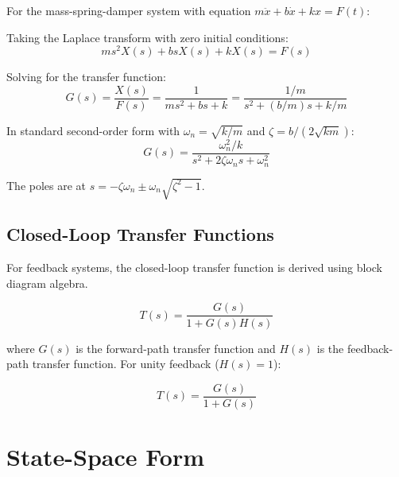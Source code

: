 \begin{examplebox}[title=Example 4.2: Mass-Spring-Damper Transfer Function]
For the mass-spring-damper system with equation $m\ddot{x} + b\dot{x} + kx = F(t)$:

Taking the Laplace transform with zero initial conditions:
\begin{equation}
ms^2X(s) + bsX(s) + kX(s) = F(s)
\end{equation}

Solving for the transfer function:
\begin{equation}
G(s) = \frac{X(s)}{F(s)} = \frac{1}{ms^2 + bs + k} = \frac{1/m}{s^2 + (b/m)s + k/m}
\end{equation}

In standard second-order form with $\omega_n = \sqrt{k/m}$ and $\zeta = b/(2\sqrt{km})$:
\begin{equation}
G(s) = \frac{\omega_n^2/k}{s^2 + 2\zeta\omega_n s + \omega_n^2}
\end{equation}

The poles are at $s = -\zeta\omega_n \pm \omega_n\sqrt{\zeta^2 - 1}$.
\end{examplebox}

\subsection{Closed-Loop Transfer Functions}

For feedback systems, the closed-loop transfer function is derived using block diagram algebra.

\begin{equation}
\boxed{T(s) = \frac{G(s)}{1 + G(s)H(s)}}
\label{eq:closed_loop_tf}
\end{equation}

where $G(s)$ is the forward-path transfer function and $H(s)$ is the feedback-path transfer function. For unity feedback ($H(s) = 1$):

\begin{equation}
T(s) = \frac{G(s)}{1 + G(s)}
\label{eq:unity_feedback_tf}
\end{equation}

\section{State-Space Form}
\label{sec:state_space_form}

